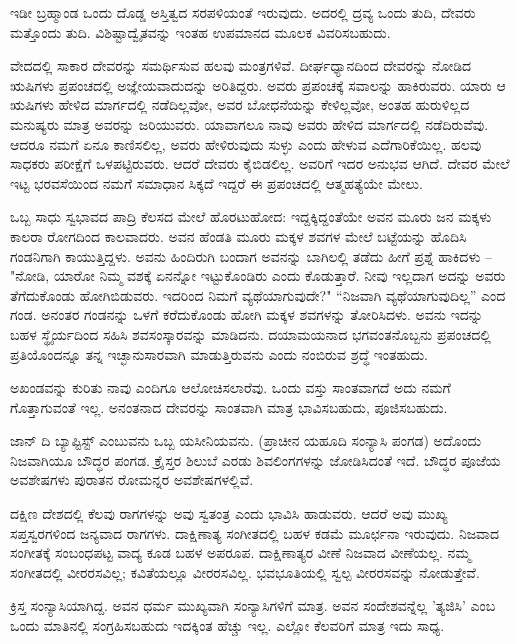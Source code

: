 ಇಡೀ ಬ್ರಹ್ಮಾಂಡ ಒಂದು ದೊಡ್ಡ ಅಸ್ತಿತ್ವದ ಸರಪಳಿಯಂತೆ ಇರುವುದು. ಅದರಲ್ಲಿ ದ್ರವ್ಯ  ಒಂದು ತುದಿ, ದೇವರು ಮತ್ತೊಂದು ತುದಿ. ವಿಶಿಷ್ಟಾದ್ವೈತವನ್ನು ಇಂತಹ ಉಪಮಾನದ ಮೂಲಕ ವಿವರಿಸಬಹುದು.

ವೇದದಲ್ಲಿ ಸಾಕಾರ ದೇವರನ್ನು ಸಮರ್ಥಿಸುವ ಹಲವು ಮಂತ್ರಗಳಿವೆ. ದೀರ್ಘಧ್ಯಾನದಿಂದ ದೇವರನ್ನು ನೋಡಿದ ಋಷಿಗಳು ಪ್ರಪಂಚದಲ್ಲಿ ಅಜ್ಞೇಯವಾದುದನ್ನು ಅರಿತಿದ್ದರು. ಅವರು ಪ್ರಪಂಚಕ್ಕೆ ಸವಾಲನ್ನು ಹಾಕಿರುವರು. ಯಾರು ಆ ಋಷಿಗಳು ಹೇಳಿದ ಮಾರ್ಗದಲ್ಲಿ ನಡೆದಿಲ್ಲವೋ, ಅವರ ಬೋಧನೆಯನ್ನು ಕೇಳಿಲ್ಲವೋ, ಅಂತಹ ಹುರುಳಿಲ್ಲದ ಮನುಷ್ಯರು ಮಾತ್ರ ಅವರನ್ನು ಜರಿಯುವರು. ಯಾವಾಗಲೂ ನಾವು ಅವರು ಹೇಳಿದ ಮಾರ್ಗದಲ್ಲಿ ನಡೆದಿರುವೆವು. ಆದರೂ ನಮಗೆ ಏನೂ ಕಾಣಿಸಲಿಲ್ಲ, ಅವರು ಹೇಳಿರುವುದು ಸುಳ್ಳು ಎಂದು ಹೇಳುವ ಎದೆಗಾರಿಕೆಯಿಲ್ಲ. ಹಲವು ಸಾಧಕರು ಪರೀಕ್ಷೆಗೆ ಒಳಪಟ್ಟಿರುವರು. ಆದರೆ ದೇವರು ಕೈಬಿಡಲಿಲ್ಲ. ಅವರಿಗೆ ಇದರ ಅನುಭವ ಆಗಿದೆ. ದೇವರ ಮೇಲೆ ಇಟ್ಟ ಭರವಸೆಯಿಂದ ನಮಗೆ ಸಮಾಧಾನ ಸಿಕ್ಕದೆ ಇದ್ದರೆ ಈ ಪ್ರಪಂಚದಲ್ಲಿ ಆತ್ಮಹತ್ಯೆಯೇ ಮೇಲು.

ಒಬ್ಬ ಸಾಧು ಸ್ವಭಾವದ ಪಾದ್ರಿ ಕೆಲಸದ ಮೇಲೆ ಹೊರಟುಹೋದ: ಇದ್ದಕ್ಕಿದ್ದಂತೆಯೇ ಅವನ ಮೂರು ಜನ ಮಕ್ಕಳು ಕಾಲರಾ ರೋಗದಿಂದ ಕಾಲವಾದರು. ಅವನ ಹೆಂಡತಿ ಮೂರು ಮಕ್ಕಳ ಶವಗಳ ಮೇಲೆ ಬಟ್ಟೆಯನ್ನು ಹೊದಿಸಿ ಗಂಡನಿಗಾಗಿ ಕಾಯುತ್ತಿದ್ದಳು. ಅವನು ಹಿಂದಿರುಗಿ ಬಂದಾಗ ಅವನನ್ನು ಬಾಗಿಲಲ್ಲಿ ತಡೆದು ಹೀಗೆ ಪ್ರಶ್ನೆ ಹಾಕಿದಳು – "ನೋಡಿ, ಯಾರೋ ನಿಮ್ಮ ವಶಕ್ಕೆ ಏನನ್ನೋ ಇಟ್ಟುಕೊಂಡಿರು ಎಂದು ಕೊಡುತ್ತಾರೆ. ನೀವು ಇಲ್ಲದಾಗ ಅದನ್ನು ಅವರು ತೆಗೆದುಕೊಂಡು ಹೋಗಿಬಿಡುವರು. ಇದರಿಂದ ನಿಮಗೆ ವ್ಯಥೆಯಾಗುವುದೇ?" “ನಿಜವಾಗಿ ವ್ಯಥೆಯಾಗುವುದಿಲ್ಲ” ಎಂದ ಗಂಡ. ಅನಂತರ ಗಂಡನನ್ನು ಒಳಗೆ ಕರೆದುಕೊಂಡು ಹೋಗಿ ಮಕ್ಕಳ ಶವಗಳನ್ನು ತೋರಿಸಿದಳು. ಅವನು ಇದನ್ನು ಬಹಳ ಸ್ಥೈರ್ಯದಿಂದ ಸಹಿಸಿ ಶವಸಂಸ್ಕಾರವನ್ನು ಮಾಡಿದನು. ದಯಾಮಯನಾದ ಭಗವಂತನೊಬ್ಬನು ಪ್ರಪಂಚದಲ್ಲಿ ಪ್ರತಿಯೊಂದನ್ನೂ ತನ್ನ ಇಚ್ಛಾನುಸಾರವಾಗಿ ಮಾಡುತ್ತಿರುವನು ಎಂದು ನಂಬಿರುವ ಶ್ರದ್ಧೆ ಇಂತಹುದು.

ಅಖಂಡವನ್ನು ಕುರಿತು ನಾವು ಎಂದಿಗೂ ಆಲೋಚಿಸಲಾರೆವು. ಒಂದು ವಸ್ತು ಸಾಂತವಾಗದೆ ಅದು ನಮಗೆ ಗೊತ್ತಾಗುವಂತೆ ಇಲ್ಲ. ಅನಂತನಾದ ದೇವರನ್ನು ಸಾಂತವಾಗಿ ಮಾತ್ರ ಭಾವಿಸಬಹುದು, ಪೂಜಿಸಬಹುದು.

ಜಾನ್ ದಿ ಬ್ಯಾಪ್ಟಿಸ್ಟ್ ಎಂಬುವನು ಒಬ್ಬ ಯಸೀನಿಯವನು. (ಪ್ರಾಚೀನ ಯಹೂದಿ ಸಂನ್ಯಾಸಿ ಪಂಗಡ) ಅದೊಂದು ನಿಜವಾಗಿಯೂ ಬೌದ್ಧರ ಪಂಗಡ. ಕ್ರೈಸ್ತರ ಶಿಲುಬೆ ಎರಡು ಶಿವಲಿಂಗಗಳನ್ನು ಜೋಡಿಸಿದಂತೆ ಇದೆ. ಬೌದ್ಧರ ಪೂಜೆಯ ಅವಶೇಷಗಳು ಪುರಾತನ ರೋಮನ್ನರ ಅವಶೇಷಗಳಲ್ಲಿವೆ.

ದಕ್ಷಿಣ ದೇಶದಲ್ಲಿ ಕೆಲವು ರಾಗಗಳನ್ನು ಅವು ಸ್ವತಂತ್ರ ಎಂದು ಭಾವಿಸಿ ಹಾಡುವರು. ಆದರೆ ಅವು ಮುಖ್ಯ ಸಪ್ತಸ್ವರಗಳಿಂದ ಜನ್ಯವಾದ ರಾಗಗಳು. ದಾಕ್ಷಿಣಾತ್ಯ ಸಂಗೀತದಲ್ಲಿ ಬಹಳ ಕಡಮೆ ಮೂರ್ಛನಾ ಇರುವುದು. ನಿಜವಾದ ಸಂಗೀತಕ್ಕೆ ಸಂಬಂಧಪಟ್ಟ ವಾದ್ಯ ಕೂಡ ಬಹಳ ಅಪರೂಪ. ದಾಕ್ಷಿಣಾತ್ಯರ ವೀಣೆ ನಿಜವಾದ ವೀಣೆಯಲ್ಲ. ನಮ್ಮ ಸಂಗೀತದಲ್ಲಿ ವೀರರಸವಿಲ್ಲ; ಕವಿತೆಯಲ್ಲೂ ವೀರರಸವಿಲ್ಲ. ಭವಭೂತಿಯಲ್ಲಿ ಸ್ವಲ್ಪ ವೀರರಸವನ್ನು ನೋಡುತ್ತೇವೆ.

\delimiter

ಕ್ರಿಸ್ತ ಸಂನ್ಯಾಸಿಯಾಗಿದ್ದ. ಅವನ ಧರ್ಮ ಮುಖ್ಯವಾಗಿ ಸಂನ್ಯಾಸಿಗಳಿಗೆ ಮಾತ್ರ. ಅವನ ಸಂದೇಶವನ್ನೆಲ್ಲ 'ತ್ಯಜಿಸಿ' ಎಂಬ ಒಂದು ಮಾತಿನಲ್ಲಿ ಸಂಗ್ರಹಿಸಬಹುದು ಇದಕ್ಕಿಂತ ಹೆಚ್ಚು ಇಲ್ಲ. ಎಲ್ಲೋ ಕೆಲವರಿಗೆ ಮಾತ್ರ ಇದು ಸಾಧ್ಯ.

